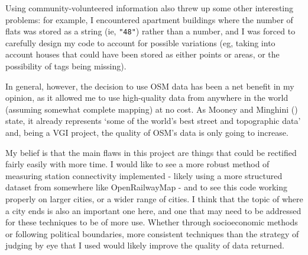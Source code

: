 \documentclass[12pt]{article} %
\begin{document}
Using community-volunteered information also threw up some other interesting problems: for example, I encountered apartment buildings where the number of flats was stored as a string (ie, \texttt{"48"}) rather than a number, and I was forced to carefully design my code to account for possible variations (eg, taking into account houses that could have been stored as either points or areas, or the possibility of tags being missing).

In general, however, the decision to use OSM data has been a net benefit in my opinion, as it allowed me to use high-quality data from anywhere in the world (assuming somewhat complete mapping) at no cost. As Mooney and Minghini (\citeyear{Mooney2017}) state, it already represents `some of the world's best street and topographic data' and, being a VGI project, the quality of OSM's data is only going to increase.

My belief is that the main flaws in this project are things that could be rectified fairly easily with more time. I would like to see a more robust method of measuring station connectivity implemented - likely using a more structured dataset from somewhere like OpenRailwayMap - and to see this code working properly on larger cities, or a wider range of cities. I think that the topic of where a city ends is also an important one here, and one that may need to be addressed for these techniques to be of more use. Whether through socioeconomic methods or following political boundaries, more consistent techniques than the strategy of judging by eye that I used would likely improve the quality of data returned.

\printbibliography
\end{document}
